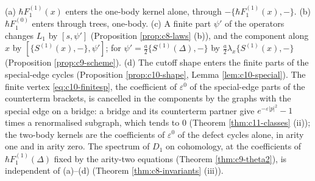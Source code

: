 \begin{remark}
\label{rem:c10-scheme1}
(a) $\hbar F_1^{(1)}(x)$ enters the one-body kernel alone, through $-\{\hbar F_1^{(1)}(x),-\}$. (b) $\hbar F_1^{(0)}$ enters through trees, one-body. (c) A finite part $\psi'$ of the operators changes $L_1$ by $[s,\psi']$ (Proposition \ref{prop:c8-laws} (b)), and the component along $x$ by $[\{S^{(1)}(x),-\},\psi']$; for $\psi'=\tfrac a2\{S^{(1)}(\Delta),-\}$ by $\tfrac a2\lambda_x\{S^{(1)}(x),-\}$ (Proposition \ref{prop:c9-scheme}). (d) The cutoff shape enters the finite parts of the special-edge cycles (Proposition \ref{prop:c10-shape}, Lemma \ref{lem:c10-special}). The finite vertex \eqref{eq:c10-finitesp}, the coefficient of $\varepsilon^0$ of the special-edge parts of the counterterm brackets, is cancelled in the components by the graphs with the special edge on a bridge: a bridge and its counterterm partner give $e^{-\varepsilon|p|^2}-1$ times a renormalised subgraph, which tends to $0$ (Theorem \ref{thm:c11-classes} (ii)); the two-body kernels are the coefficients of $\varepsilon^0$ of the defect cycles alone, in arity one and in arity zero. The spectrum of $D_1$ on cohomology, at the coefficients of $\hbar F_1^{(1)}(\Delta)$ fixed by the arity-two equations (Theorem \ref{thm:c9-theta2}), is independent of (a)--(d) (Theorem \ref{thm:c8-invariants} (iii)).
\end{remark}
